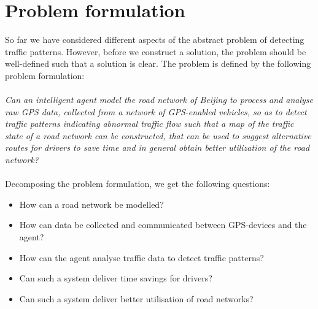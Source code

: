 \section{Problem formulation}
So far we have considered different aspects of the abstract problem of detecting traffic patterns. However, before we construct a solution, the problem should be well-defined such that a solution is clear. The problem is defined by the following problem formulation:
\\\\
\emph{Can an intelligent agent model the road network of Beijing to process and analyse raw GPS data, collected from a network of GPS-enabled vehicles, so as to detect traffic patterns indicating abnormal traffic flow such that a map of the traffic state of a road network can be constructed, that can be used to suggest alternative routes for drivers to save time and in general obtain better utilization of the road network?}
\\\\
Decomposing the problem formulation, we get the following questions:

\begin{itemize}
\item How can a road network be modelled?
\item How can data be collected and communicated between GPS-devices and the agent?
\item How can the agent analyse traffic data to detect traffic patterns?
\item Can such a system deliver time savings for drivers?
\item Can such a system deliver better utilisation of road networks?
\end{itemize}



% 